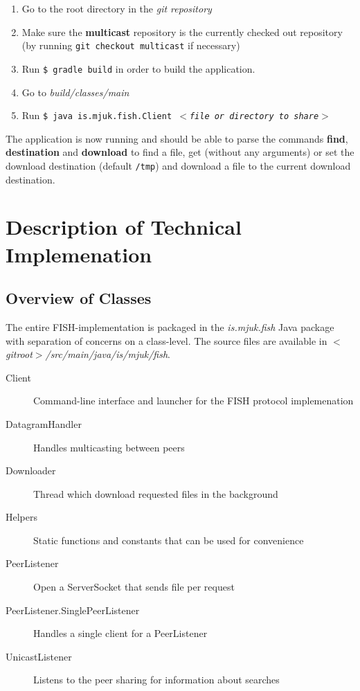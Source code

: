 \documentclass[11pt]{article}
\begin{document}
\begin{enumerate}
    \item Go to the root directory in the \textit{git repository}
    \item Make sure the \textbf{multicast} repository is the currently checked
        out repository (by running \texttt{git checkout multicast} if necessary)
    \item Run \texttt{\$ gradle build} in order to build the application.
    \item Go to \textit{build/classes/main}
    \item Run \texttt{\$ java is.mjuk.fish.Client
        $<$\textit{file or directory to share}$>$}
\end{enumerate}

The application is now running and should be able to parse the commands
\textbf{find}, \textbf{destination} and \textbf{download} to find a file,
get (without any arguments) or set the download destination (default
\texttt{/tmp}) and download a file to the current download destination.

\section{Description of Technical Implemenation}

\subsection{Overview of Classes}

The entire FISH-implementation is packaged in the \textit{is.mjuk.fish} Java
package with separation of concerns on a class-level. The source files are
available in \textit{$<$gitroot$>$/src/main/java/is/mjuk/fish}.

\begin{description}
    \item[Client] Command-line interface and launcher for the FISH protocol implemenation
    \item[DatagramHandler] Handles multicasting between peers
    \item[Downloader] Thread which download requested files in the background
    \item[Helpers] Static functions and constants that can be used for convenience
    \item[PeerListener] Open a ServerSocket that sends file per request
    \item[PeerListener.SinglePeerListener] Handles a single client for a PeerListener
    \item[UnicastListener] Listens to the peer sharing for information about searches
\end{description}
\end{document}
